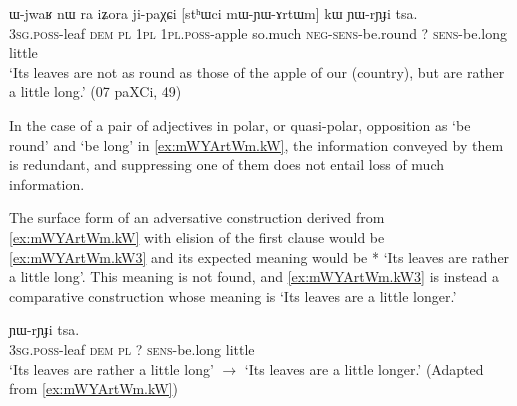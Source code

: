\documentclass[oldfontcommands,oneside,a4paper,11pt]{article}
\newcommand{\ipa}[1]{{\phon #1}} %
\begin{document}
           \begin{exe}
  \ex  \label{ex:mWYArtWm.kW}  
  \gll      
\ipa{ɯ-jwaʁ} 	\ipa{nɯ} \ipa{ra} 	\ipa{iʑora} 	\ipa{ji-paχɕi} 	[\ipa{stʰɯci} 	\ipa{mɯ-ɲɯ-ɤrtɯm}] 	\ipa{kɯ} 	\ipa{ɲɯ-rɲɟi} 	\ipa{tsa.} \\
\textsc{3sg.poss}-leaf \textsc{dem} \textsc{pl} \textsc{1pl} \textsc{1pl.poss}-apple so.much \textsc{neg-sens}-be.round ?{ } \textsc{sens}-be.long little \\
\glt `Its leaves  are not as round as those of the apple of our (country), but are rather a little long.'
(07 paXCi, 49)
          \end{exe} 
 
% 
          
          In the case of a pair of adjectives in polar, or quasi-polar, opposition as `be round' and  `be long' in \ref{ex:mWYArtWm.kW}, the information conveyed by them is redundant, and suppressing one of them does not entail loss of much information.   
          
          The surface form of an adversative construction derived from \ref{ex:mWYArtWm.kW}  with elision  of the first clause would be  \ref{ex:mWYArtWm.kW3}  and its expected meaning would be * `Its leaves are  rather a little long'.   This meaning is not found, and \ref{ex:mWYArtWm.kW3}   is instead a comparative construction whose meaning is `Its leaves are a little longer.' 
            
                      \begin{exe}
  \ex  \label{ex:mWYArtWm.kW3}  
  \gll      
[\ipa{ɯ-jwaʁ} 	\ipa{nɯ}   \ipa{ra}] 	\ipa{kɯ} 	\ipa{ɲɯ-rɲɟi} 	\ipa{tsa.} \\
\textsc{3sg.poss}-leaf \textsc{dem} \textsc{pl}   ?{ } \textsc{sens}-be.long little \\
\glt *`Its leaves are rather a little long'  $\rightarrow$  `Its leaves are a little longer.'
(Adapted from \ref{ex:mWYArtWm.kW})
          \end{exe} 
  
\end{document}
